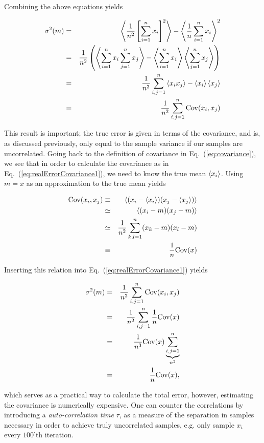 Combining the above equations yields

\begin{eqnarray}
\label{eq:realErrorCovariance1}
  \sigma^2(m) &=& \left< \frac{1}{n^2}\left[\sum_{i=1}^nx_i\right]^2 \right> - \left< \frac{1}{n}\sum_{i=1}^n x_i \right>^2 \nonumber\\
              &=& \frac{1}{n^2}\left( \left< \sum_{i=1}^n x_i\sum_{j=1}^n x_j \right> - \left< \sum_{i=1}^n x_i \right>\left< \sum_{j=1}^n x_j \right>  \right) \nonumber\\
              &=& \frac{1}{n^2}\sum_{i,j=1}^n \left< x_ix_j \right> - \left< x_i \right>\left< x_j \right> \nonumber\\
              &=& \frac{1}{n^2}\sum_{i,j=1}^n \mathrm{Cov}(x_i, x_j)
\end{eqnarray}

This result is important; the true error is given in terms of the covariance, and is, as discussed previously, only equal to the sample variance if our samples are uncorrelated. Going back to the definition of covariance in Eq.~(\ref{eq:covariance}), we see that in order to calculate the covariance as in Eq.~(\ref{eq:realErrorCovariance1}), we need to know the true mean $\left< x_i \right>$. Using $m=\overline{x}$ as an approximation to the true mean yields   

\begin{eqnarray}
 \mathrm{Cov}(x_i, x_j) &\equiv& \left< (x_i - \left< x_i \right>)(x_j - \left< x_j \right>) \right> \nonumber\\
                &\simeq& \left< (x_i - m)(x_j - m) \right> \nonumber\\
                &\simeq& \frac{1}{n^2}\sum_{k,l=1}^n (x_k-m)(x_l-m) \\
                &\equiv& \frac{1}{n}\mathrm{Cov}(x)
\end{eqnarray}

Inserting this relation into Eq.~(\ref{eq:realErrorCovariance1}) yields

\begin{eqnarray}
\label{eq:realErrorCovariance2}
   \sigma^2(m) &=& \frac{1}{n^2}\sum_{i,j=1}^n \mathrm{Cov}(x_i, x_j) \nonumber\\
               &=& \frac{1}{n^2}\sum_{i,j=1}^n \frac{1}{n}\mathrm{Cov}(x) \nonumber\\
               &=& \frac{1}{n^3}\mathrm{Cov}(x)\underbrace{\sum_{i,j=1}^n}_{n^2}  \nonumber\\
               &=& \frac{1}{n} \mathrm{Cov}(x),
\end{eqnarray}

which serves as a practical way to calculate the total error, however, estimating the covariance is numerically expensive. One can counter the correlations by introducing a \textit{auto-correlation time} $\tau$, as a measure of the separation in samples necessary in order to achieve truly uncorrelated samples, e.g. only sample $x_i$ every $100$'th iteration.  

